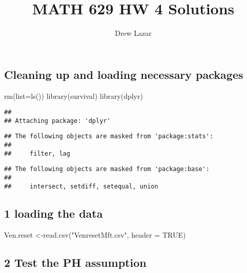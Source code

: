 \documentclass[
]{article}
\title{MATH 629 HW 4 Solutions}
\author{Drew Lazar}
\date{}
\newenvironment{Shaded}{\begin{snugshade}}{\end{snugshade}}
\newcommand{\AttributeTok}[1]{\textcolor[rgb]{0.77,0.63,0.00}{#1}}
\newcommand{\ConstantTok}[1]{\textcolor[rgb]{0.00,0.00,0.00}{#1}}
\newcommand{\FunctionTok}[1]{\textcolor[rgb]{0.00,0.00,0.00}{#1}}
\newcommand{\NormalTok}[1]{#1}
\newcommand{\OtherTok}[1]{\textcolor[rgb]{0.56,0.35,0.01}{#1}}
\newcommand{\StringTok}[1]{\textcolor[rgb]{0.31,0.60,0.02}{#1}}
\begin{document}
\maketitle

\hypertarget{cleaning-up-and-loading-necessary-packages}{%
\subsection{Cleaning up and loading necessary
packages}\label{cleaning-up-and-loading-necessary-packages}}

\begin{Shaded}
\begin{Highlighting}[]
\FunctionTok{rm}\NormalTok{(}\AttributeTok{list=}\FunctionTok{ls}\NormalTok{())}
\FunctionTok{library}\NormalTok{(survival)}
\FunctionTok{library}\NormalTok{(dplyr)}
\end{Highlighting}
\end{Shaded}

\begin{verbatim}
## 
## Attaching package: 'dplyr'
\end{verbatim}

\begin{verbatim}
## The following objects are masked from 'package:stats':
## 
##     filter, lag
\end{verbatim}

\begin{verbatim}
## The following objects are masked from 'package:base':
## 
##     intersect, setdiff, setequal, union
\end{verbatim}

\hypertarget{loading-the-data}{%
\subsection{1 loading the data}\label{loading-the-data}}

\begin{Shaded}
\begin{Highlighting}[]
\NormalTok{Ven.reset }\OtherTok{\textless{}{-}}\FunctionTok{read.csv}\NormalTok{(}\StringTok{"VenresetMft.csv"}\NormalTok{, }\AttributeTok{header =} \ConstantTok{TRUE}\NormalTok{)}
\end{Highlighting}
\end{Shaded}

\hypertarget{test-the-ph-assumption}{%
\subsection{2 Test the PH assumption}\label{test-the-ph-assumption}}
\end{document}
